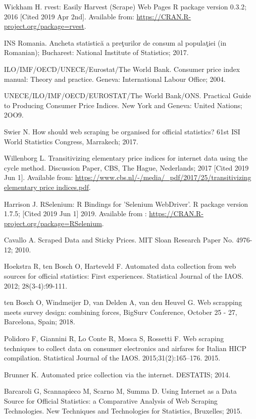 \documentclass[]{article}
\begin{document}
\begin{thebibliography}{99}
Wickham H. rvest: Easily Harvest (Scrape) Web Pages {R package version 0.3.2}; 2016 [Cited 2019 Apr 2nd]. Available from:
\url{https://CRAN.R-project.org/package=rvest}.

INS Romania. Ancheta statistică a preţurilor de consum al populaţiei (in Romanian); Bucharest: National Institute of Statistics; 2017.

ILO/IMF/OECD/UNECE/Eurostat/The World Bank. Consumer price index manual: Theory and practice. Geneva: International Labour Office; 2004.

UNECE/ILO/IMF/OECD/EUROSTAT/The World Bank/ONS. Practical Guide to Producing Consumer Price Indices. New York and Geneva: United Nations; 2OO9.


Swier N. How should web scraping be organised for official statistics? 61st ISI World Statistics Congress, Marrakech; 2017.


Willenborg L. Transitivizing elementary price indices for internet data using the cycle method. Discussion Paper, CBS, The Hague, Nederlands; 2017 [Cited 2019 Jun 1]. 
Available from: \url{https://www.cbs.nl/-/media/_pdf/2017/25/transitivizing elementary price indices.pdf}.


Harrison J. RSelenium: R Bindings for 'Selenium WebDriver'. R package version 1.7.5; [Cited 2019 Jun 1] 2019. Available from :
\url{https://CRAN.R-project.org/package=RSelenium}.


Cavallo A. Scraped Data and Sticky Prices. MIT Sloan Research Paper No. 4976-12; 2010.


Hoekstra R, ten Bosch O, Harteveld F. Automated data collection from web sources for official statistics: First experiences. 
Statistical Journal of the IAOS. 2012; 28(3-4):99-111.

ten Bosch O, Windmeijer D, van Delden A, van den Heuvel G. Web scrapping meets survey design: combining forces,
BigSurv Conference, October 25 - 27, Barcelona, Spain; 2018.


Polidoro F, Giannini R, Lo Conte R, Mosca S, Rossetti F. Web scraping techniques to collect data on consumer electronics and airfares for Italian HICP compilation. Statistical Journal of the IAOS. 2015;31(2):165–176.
2015.

Brunner K. Automated price collection via the internet. DESTATIS; 2014.

Barcaroli G, Scannapieco M, Scarno M, Summa D. Using Internet as a Data Source for Official Statistics: a Comparative Analysis of Web Scraping Technologies.
New Techniques and Technologies for Statistics, Bruxelles; 2015.



\end{thebibliography}
\end{document}
